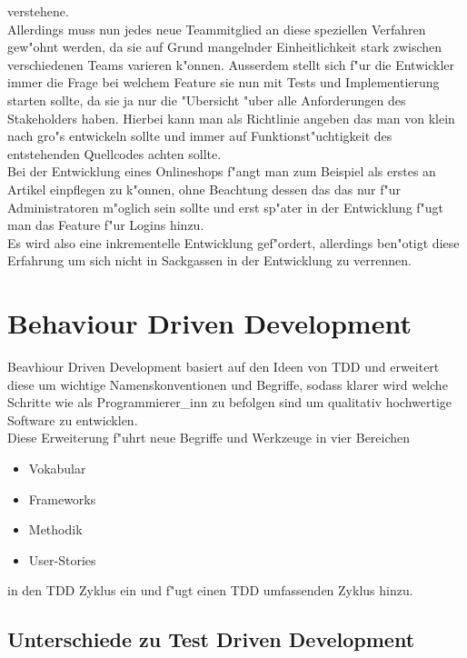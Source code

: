 \documentclass[runningheads,a4paper]{llncs}
\begin{document}
    verstehene.\\
    Allerdings muss nun jedes neue Teammitglied an diese speziellen Verfahren
    gew"ohnt werden, da sie auf Grund mangelnder Einheitlichkeit stark zwischen
    verschiedenen Teams varieren k"onnen.
    Ausserdem stellt sich f"ur die Entwickler immer die Frage bei welchem Feature
    sie nun mit Tests und Implementierung starten sollte, da sie ja nur die 
    "Ubersicht "uber alle Anforderungen des Stakeholders haben. Hierbei kann man
    als Richtlinie angeben das man von klein nach gro"s entwickeln sollte und 
    immer auf Funktionst"uchtigkeit des entstehenden Quellcodes achten sollte.\\
    Bei der Entwicklung eines Onlineshops f"angt man zum Beispiel als erstes 
    an Artikel einpflegen zu k"onnen, ohne Beachtung dessen das das nur f"ur
    Administratoren m"oglich sein sollte und erst sp"ater in der Entwicklung
    f"ugt man das Feature f"ur Logins hinzu.\\
    Es wird also eine inkrementelle Entwicklung gef"ordert, allerdings ben"otigt
    diese Erfahrung um sich nicht in Sackgassen in der Entwicklung zu verrennen.\\

\section{Behaviour Driven Development}
  Beavhiour Driven Development basiert auf den Ideen von TDD und erweitert diese
  um wichtige Namenskonventionen und Begriffe, sodass klarer wird welche Schritte
  wie als Programmierer\_inn zu befolgen sind um qualitativ hochwertige Software
  zu entwicklen.\\
  Diese Erweiterung f"uhrt neue Begriffe und Werkzeuge in vier Bereichen
  \begin{itemize}
    \item Vokabular
    \item Frameworks
    \item Methodik
    \item User-Stories
  \end{itemize}
  in den TDD Zyklus ein und f"ugt einen TDD umfassenden Zyklus hinzu.

  \subsection{Unterschiede zu Test Driven Development}
\end{document}
